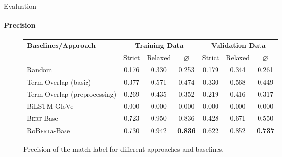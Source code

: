 \documentclass[english,handout]{mlutalk}
\newcommand{\BiLSTM}{\mbox{BiLSTM}\xspace}
\newcommand{\Bert}{\textsc{Bert}\xspace}
\newcommand{\BertBase}{\Bert-Base\xspace}
\newcommand{\Roberta}{\mbox{Ro\textsc{Bert}a}\xspace}
\newcommand{\RobertaBase}{\Roberta-Base\xspace}
\renewcommand{\lg}{\color{lightgray}}
\begin{document}
\begin{frame}{Evaluation}
  \framesubtitle{Precision}
  \begin{figure}
    \centering
    \caption{Precision of the match label for different approaches and baselines.}
    \scriptsize
    \begin{tabular}{lcccccc}
      \toprule
      \textbf{Baselines/Approach} & \multicolumn{3}{c}{\textbf{Training Data}} & \multicolumn{3}{c}{\textbf{Validation Data}} \\
      \cmidrule(r{0.5em}){2-4} \cmidrule(l{0.5em}){5-7}
      & Strict & Relaxed & \(\varnothing\) & Strict & Relaxed & \(\varnothing\) \\
      \midrule
      Random 
      & 0.176 & 0.330 & 0.253 & 0.179 & 0.344 & 0.261 \\
      Term Overlap (basic)
      & 0.377 & 0.571 & 0.474 & 0.330 & 0.568 & 0.449 \\
      Term Overlap (preprocessing)
      & 0.269 & 0.435 & 0.352 & 0.219 & 0.416 & 0.317 \\
      \midrule
      \lg\BiLSTM-GloVe
      & \lg0.000 & \lg0.000 & \lg0.000 & \lg0.000 & \lg0.000 & \lg0.000 \\
      \BertBase
      & 0.723 & 0.950 & 0.836 & 0.428 & 0.671 & 0.550 \\
      \RobertaBase
      & 0.730 & 0.942 & \textbf{\underline{0.836}} & 0.622 & 0.852 & \textbf{\underline{0.737}} \\
      \bottomrule
    \end{tabular}
  \end{figure}
\end{frame}
\end{document}
